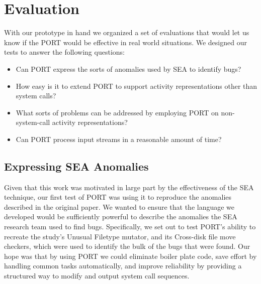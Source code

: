 \section{Evaluation}
\label{SEC:evaluation}

With our prototype in hand we organized a set of
evaluations that would let us know if the PORT would be effective
in real world situations.
We designed our tests to answer the following questions:

\begin{itemize}

  \item{Can PORT express the sorts of anomalies used by SEA to identify
    bugs?}

  \item{How easy is it to extend PORT to support activity representations
    other than system calls?}

  \item{What sorts of problems can be addressed by employing PORT on
  non-system-call activity representations?}

  \item{Can PORT process input streams in a reasonable amount of time?}

\end{itemize}


\subsection{Expressing SEA Anomalies}
\label{sub:SEAAnomalies}
Given that this work was motivated
in large part
by the effectiveness of the SEA technique,
our first test of PORT was using it to reproduce the anomalies described
in the original paper.
We wanted to ensure that
the language we developed
would be sufficiently powerful
to describe the anomalies the
SEA research team used to
find bugs.
Specifically,
we set out to test PORT's ability to recreate
the study's Unusual Filetype mutator,
and its Cross-disk file move checkers, which were used to identify
the bulk of
the bugs that were found.
Our hope was that by using PORT we could eliminate boiler plate code,
save effort by handling common tasks automatically, and improve reliability
by providing a structured way to modify and output system call sequences.

